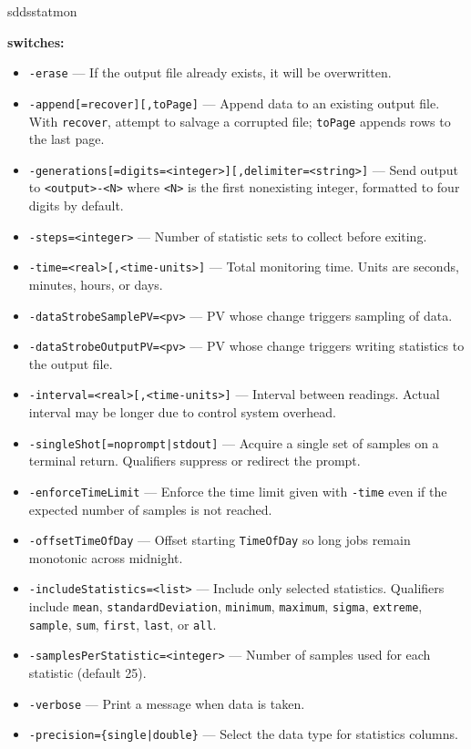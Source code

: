 \begin{sddsprog}{sddsstatmon}
\item \textbf{switches:}
\begin{itemize}
  \item {\tt -erase} --- If the output file already exists, it will be overwritten.
  \item {\tt -append[=recover][,toPage]} --- Append data to an existing output file. With \verb+recover+, attempt to salvage a corrupted file; \verb+toPage+ appends rows to the last page.
  \item {\verb+-generations[=digits=<integer>][,delimiter=<string>]+} --- Send output to \verb+<output>-<N>+ where \verb+<N>+ is the first nonexisting integer, formatted to four digits by default.
  \item {\tt -steps=<integer>} --- Number of statistic sets to collect before exiting.
  \item {\tt -time=<real>[,<time-units>]} --- Total monitoring time. Units are seconds, minutes, hours, or days.
  \item {\tt -dataStrobeSamplePV=<pv>} --- PV whose change triggers sampling of data.
  \item {\tt -dataStrobeOutputPV=<pv>} --- PV whose change triggers writing statistics to the output file.
  \item {\tt -interval=<real>[,<time-units>]} --- Interval between readings. Actual interval may be longer due to control system overhead.
  \item {\tt -singleShot[={noprompt|stdout}]} --- Acquire a single set of samples on a terminal return. Qualifiers suppress or redirect the prompt.
  \item {\tt -enforceTimeLimit} --- Enforce the time limit given with \verb+-time+ even if the expected number of samples is not reached.
  \item {\tt -offsetTimeOfDay} --- Offset starting \verb+TimeOfDay+ so long jobs remain monotonic across midnight.
  \item {\tt -includeStatistics=<list>} --- Include only selected statistics. Qualifiers include \verb+mean+, \verb+standardDeviation+, \verb+minimum+, \verb+maximum+, \verb+sigma+, \verb+extreme+, \verb+sample+, \verb+sum+, \verb+first+, \verb+last+, or \verb+all+.
  \item {\tt -samplesPerStatistic=<integer>} --- Number of samples used for each statistic (default 25).
  \item {\tt -verbose} --- Print a message when data is taken.
  \item {\tt -precision=\{single|double\}} --- Select the data type for statistics columns.

\end{itemize}
\end{sddsprog}
